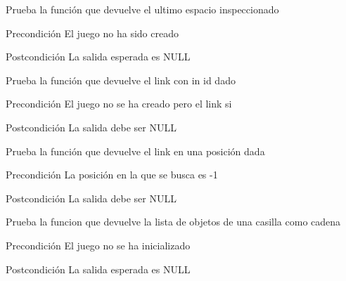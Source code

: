 \begin{DoxyRefList}
\item[\label{test__test000102}%
\hypertarget{test__test000102}{}%
Global \hyperlink{game__test_8c_abcdea325bd5d140c7f9af0f9d0419fac}{test2\-\_\-game\-\_\-get\-\_\-last\-\_\-inspected\-\_\-space} ()]Prueba la función que devuelve el ultimo espacio inspeccionado \begin{DoxyPrecond}{Precondición}
El juego no ha sido creado 
\end{DoxyPrecond}
\begin{DoxyPostcond}{Postcondición}
La salida esperada es N\-U\-L\-L  
\end{DoxyPostcond}

\item[\label{test__test000081}%
\hypertarget{test__test000081}{}%
Global \hyperlink{game__test_8c_a9d9fe90216f392c5cb61aff46555524f}{test2\-\_\-game\-\_\-get\-\_\-link} ()]Prueba la función que devuelve el link con in id dado \begin{DoxyPrecond}{Precondición}
El juego no se ha creado pero el link si 
\end{DoxyPrecond}
\begin{DoxyPostcond}{Postcondición}
La salida debe ser N\-U\-L\-L  
\end{DoxyPostcond}

\item[\label{test__test000084}%
\hypertarget{test__test000084}{}%
Global \hyperlink{game__test_8c_abc42bfadfa87c42fffbd07ce577aa144}{test2\-\_\-game\-\_\-get\-\_\-link\-\_\-at} ()]Prueba la función que devuelve el link en una posición dada \begin{DoxyPrecond}{Precondición}
La posición en la que se busca es -\/1 
\end{DoxyPrecond}
\begin{DoxyPostcond}{Postcondición}
La salida debe ser N\-U\-L\-L  
\end{DoxyPostcond}

\item[\label{test__test000100}%
\hypertarget{test__test000100}{}%
Global \hyperlink{game__test_8c_a85db0154c1d8d12aa3a72a22b30b81a2}{test2\-\_\-game\-\_\-get\-\_\-obj\-\_\-list\-\_\-as\-\_\-str} ()]Prueba la funcion que devuelve la lista de objetos de una casilla como cadena \begin{DoxyPrecond}{Precondición}
El juego no se ha inicializado 
\end{DoxyPrecond}
\begin{DoxyPostcond}{Postcondición}
La salida esperada es N\-U\-L\-L  
\end{DoxyPostcond}


\end{DoxyRefList}
